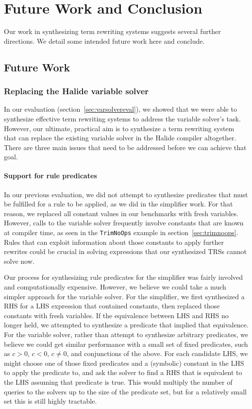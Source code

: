 \chapter{Future Work and Conclusion}
\label{chapter:conclusion}

Our work in synthesizing term rewriting systems suggests several further directions. We detail some intended future work here and conclude.

\section{Future Work}

\subsection{Replacing the Halide variable solver}
\label{sec:varsolverreplacement}

In our evaluation (section~\ref{sec:varsolvereval}), we showed that we were able to synthesize effective term rewriting systems to address the variable solver's task. However, our ultimate, practical aim is to synthesize a term rewriting system that can replace the existing variable solver in the Halide compiler altogether. There are three main issues that need to be addressed before we can achieve that goal.

\subsubsection{Support for rule predicates}
In our previous evaluation, we did not attempt to synthesize predicates that must be fulfilled for a rule to be applied, as we did in the simplifier work. For that reason, we replaced all constant values in our benchmarks with fresh variables. However, calls to the variable solver frequently involve constants that are known at compiler time, as seen in the \texttt{TrimNoOps} example in section~\ref{sec:trimnoops}. Rules that can exploit information about those constants to apply further rewrites could be crucial in solving expressions that our synthesized TRSs cannot solve now.

Our process for synthesizing rule predicates for the simplifier was fairly involved and computationally expensive. However, we believe we could take a much simpler approach for the variable solver. For the simplifier, we first synthesized a RHS for a LHS expression that contained constants, then replaced those constants with fresh variables. If the equivalence between LHS and RHS no longer held, we attempted to synthesize a predicate that implied that equivalence. For the variable solver, rather than attempt to synthesize arbitrary predicates, we believe we could get similar performance with a small set of fixed predicates, such as $c > 0$, $c < 0$, $c \neq 0$, and conjunctions of the above. For each candidate LHS, we might choose one of those fixed predicates and a (symbolic) constant in the LHS to apply the predicate to, and ask the solver to find a RHS that is equivalent to the LHS assuming that predicate is true. This would multiply the number of queries to the solvers up to the size of the predicate set, but for a relatively small set this is still highly tractable.

